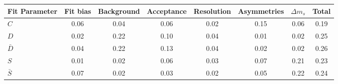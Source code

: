 \begin{tabular}{l  c  c  c  c  c  c  | c }
\hline
\hline
Fit Parameter & Fit bias & Background & Acceptance & Resolution & Asymmetries & $\Delta m_{s}$ &  Total  \\ 
\hline
$C$ & 0.06 & 0.04 & 0.06 & 0.02 & 0.15 & 0.06 & 0.19 \\ 
$D$ & 0.02 & 0.22 & 0.10 & 0.04 & 0.01 & 0.02 & 0.25 \\ 
$\bar{D}$ & 0.04 & 0.22 & 0.13 & 0.04 & 0.02 & 0.02 & 0.26 \\ 
$S$ & 0.01 & 0.02 & 0.06 & 0.03 & 0.07 & 0.21 & 0.23 \\ 
$\bar{S}$ & 0.07 & 0.02 & 0.03 & 0.02 & 0.05 & 0.22 & 0.24 \\ 
\hline
\hline
\end{tabular}
